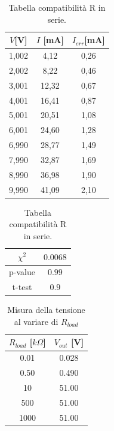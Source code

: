 \documentclass[letterpaper,12pt]{article}
\begin{document}
\begin{table}[htbp]
\begin{subtable}{0.5\textwidth}
    \centering
    \begin{tabular}{ccc}
        \toprule
        \rowcolor{blue!10}
    \textbf{$V$[V]} & \textbf{$I$ [mA]}   & \textbf{$I_{err}$[mA]} \\
        \midrule
        1,002 & 4,12  & 0,26 \\ 
        2,002 & 8,22  & 0,46 \\ 
        3,001 & 12,32 & 0,67 \\ 
        4,001 & 16,41 & 0,87 \\ 
        5,001 & 20,51 & 1,08 \\ 
        6,001 & 24,60  & 1,28 \\ 
        6,990 & 28,77 & 1,49 \\ 
        7,990 & 32,87 & 1,69 \\ 
        8,990 & 36,98 & 1,90  \\ 
        9,990 & 41,09 & 2,10  \\ 
        \bottomrule
    \end{tabular}
    \caption{Misure Resistenze in serie}
    \label{subtab:Misure_ohm_R_serie}
\end{subtable}%
\begin{subtable}{0.5\textwidth}
\centering
\begin{tabular}{c|c}
    \hline
    \cellcolor{blue!10}$\chi^2$ & $0.0068$ \\ \hline
    \cellcolor{blue!10}p-value & $0.99$ \\ \hline
    \cellcolor{blue!10}t-test & $0.9$ \\
    \hline
    \end{tabular}
    \caption{Tabella compatibilità R in serie.}
    \label{subtab:Tab_compatib_ohm_serie}
    \end{subtable}
\end{table}

\begin{table}[htbp]
\centering
\begin{tabular}{c|c}
    \toprule
    \rowcolor{blue!10}
    $R_{load}$ [$k\Omega$] & $V_{out}$ [V]\\
    \hline
    0.01 & 0.028\\
    0.50 & 0.490\\
    10 & 51.00\\
    500 & 51.00\\
    1000 & 51.00\\
    \hline
    \end{tabular}
    \caption{Misura della tensione al variare di $R_{load}$}
    \label{tab:Misura tensione Rload}
\end{table}
\end{document}

